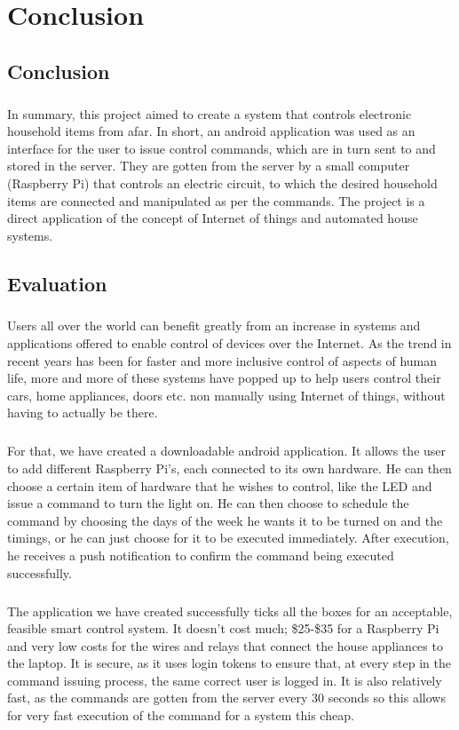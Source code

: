 \documentclass[12pt, oneside, a4paper]{book}
\newcommand{\mychapter}[1]{\newpage%
	\thispagestyle{empty}
	\topskip0pt%
	\vspace*{\fill}%
	\addtocounter{chapter}{1}%
	\begin{center}%
		\textbf{\Large{\color{chapter}{CHAPTER NO. \thechapter \\ \uppercase{#1}}}}%
	\end{center}%
	\vspace*{\fill}%
	\addtocounter{chapter}{-1}
	\newpage%
	\chapter{#1}
}
\begin{document}
		\newpage	
	\mychapter{Conclusion}
		\section{Conclusion}
		\paragraph{}In summary, this project aimed to create a system that controls electronic household items from afar. In short, an android application was used as an interface for the user to issue control commands, which are in turn sent to and stored in the server. They are gotten from the server by a small computer (Raspberry Pi) that controls an electric circuit, to which the desired household items are connected and manipulated as per the commands. The project is a direct application of the concept of Internet of things and automated house systems.
		
		\section{Evaluation}
		\paragraph{}Users all over the world can benefit greatly from an increase in systems and applications offered to enable control of devices over the Internet. As the trend in recent years has been for faster and more inclusive control of aspects of human life, more and more of these systems have popped up to help users control their cars, home appliances, doors etc. non manually using Internet of things, without having to actually be there.
		\paragraph{}For that, we have created a downloadable android application. It allows the user to add different Raspberry Pi’s, each connected to its own hardware. He can then choose a certain item of hardware that he wishes to control, like the LED and issue a command to turn the light on. He can then choose to schedule the command by choosing the days of the week he wants it to be turned on and the timings, or he can just choose for it to be executed immediately. After execution, he receives a push notification to confirm the command being executed successfully.
		\paragraph{}The application we have created successfully ticks all the boxes for an acceptable, feasible smart control system. It doesn’t cost much; \$25-\$35 for a Raspberry Pi and very low costs for the wires and relays that connect the house appliances to the laptop. It is secure, as it uses login tokens to ensure that, at every step in the command issuing process, the same correct user is logged in. It is also relatively fast, as the commands are gotten from the server every 30 seconds so this allows for very fast execution of the command for a system this cheap.
\end{document}
